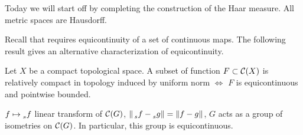 
Today we will start off by completing the construction of the
Haar measure. All metric spaces are Hausdorff.

Recall that  requires equicontinuity of a set of continuous
maps. The following result gives an alternative characterization of
equicontinuity.

\begin{theorem}
  \label{thm:arzela-ascoli}
  Let $X$ be a compact topological space.
  A subset of function $F \subset \mathcal{C}(X)$ is relatively compact in topology
  induced by uniform norm $\iff$ $F$ is equicontinuous and pointwise
  bounded.
\end{theorem}

$f \mapsto \prescript{}{s}{f}$ linear transform of $\mathcal{C}(G)$,
$\|\prescript{}{s}{f} - \prescript{}{s}{g}\| = \|f - g\|$,
$G$ acts as a group of isometries on $\mathcal{C}(G)$. In particular,
this group is equicontinuous.


